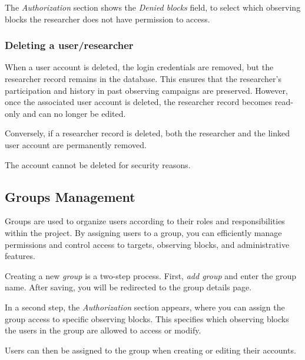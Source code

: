 
The \textsl{Authorization} section shows the \textsl{Denied blocks} field, to select which observing blocks the researcher does not have permission to access.


\subsubsection{Deleting a user/researcher}

When a user account is deleted, the login credentials are removed, but the researcher record remains in the database. This ensures that the researcher’s participation and history in past observing campaigns are preserved. However, once the associated user account is deleted, the researcher record becomes read-only and can no longer be edited. 

\warning Conversely, if a researcher record is deleted, both the researcher and the linked user account are permanently removed.

\warning The \admin account cannot be deleted for security reasons.

\subsection{Groups Management}

Groups are used to organize users according to their roles and responsibilities within the project. By assigning users to a group, you can efficiently manage permissions and control access to targets, observing blocks, and administrative features.

Creating a new \textsl{group} is a two-step process. First, \textsl{add group} and enter the group name. After saving, you will be redirected to the group details page. 


In a second step, the \textsl{Authorization} section appears, where you can assign the group access to specific observing blocks. This specifies which observing blocks the users in the group are allowed to access or modify.


Users can then be assigned to the group when creating or editing their accounts.




